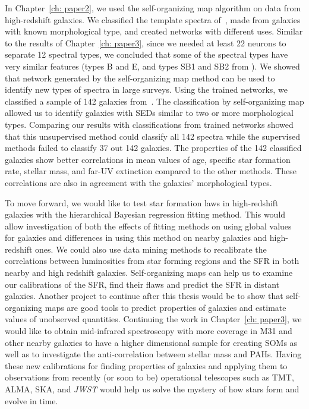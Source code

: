 In Chapter~\ref{ch: paper2}, we used the self-organizing map algorithm on data from high-redshift galaxies.
We classified the template spectra of~\citet{Kinney96}, made from galaxies with known morphological type, and created networks with different uses.
Similar to the results of Chapter~\ref{ch: paper3}, since we needed at least 22 neurons to separate 12 spectral types, we concluded that some of the spectral types have very similar features (types B and E, and types SB1 and SB2 from \citealt{Kinney96}).
We showed that network generated by the self-organizing map method can be used to identify new types of spectra in large surveys.
Using the trained networks, we classified a sample of 142 galaxies from~\citet{Hossein12}.
The classification by self-organizing map allowed us to identify galaxies with SEDs similar to two or more morphological types.
Comparing our results with classifications from trained networks showed that this unsupervised method could classify all 142 spectra while the supervised methods failed to classify 37 out 142 galaxies. 
The properties of the 142 classified galaxies show better correlations in mean values of age, specific star formation rate, stellar mass, and far-UV extinction compared to the other methods.
These correlations are also in agreement with the galaxies' morphological types.

To move forward, we would like to test star formation laws in high-redshift galaxies with the hierarchical Bayesian regression fitting method. This would allow investigation of both the effects of fitting methods on using global values for galaxies and differences in using this method on nearby galaxies and high-redshift ones.  
We could also use data mining methods to recalibrate the correlations between luminosities from star forming regions and the SFR in both nearby and high redshift galaxies.
Self-organizing maps can help us to examine our calibrations of the SFR, find their flaws and predict the SFR in distant galaxies.
Another project to continue after this thesis would be to show that self-organizing maps are good tools to predict properties of galaxies and estimate values of unobserved quantities.
Continuing the work in Chapter~\ref{ch: paper3}, we would like to obtain mid-infrared spectroscopy with more coverage in M31 and other nearby galaxies to have a higher dimensional sample for creating SOMs as well as to investigate the anti-correlation between stellar mass and PAHs.
Having these new calibrations for finding properties of galaxies and applying them to observations from recently (or soon to be) operational telescopes such as TMT, ALMA, SKA, and {\it JWST} would help us solve the mystery of how stars form and evolve in time.





